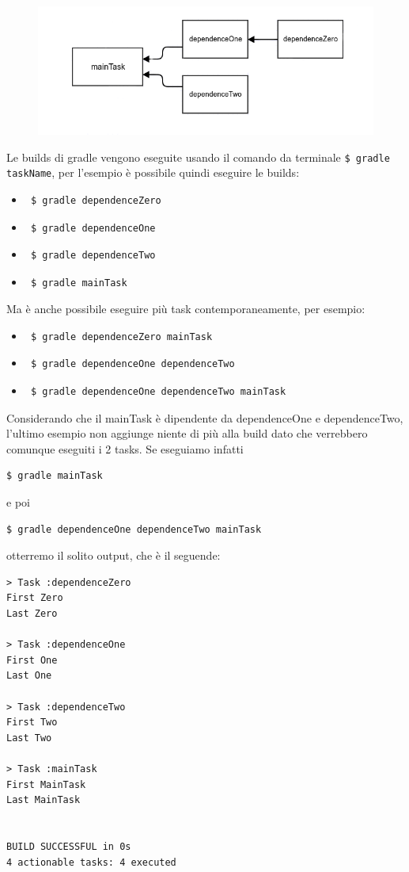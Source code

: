 \begin{figure}[H]
\includegraphics[scale=0.40]{HowToUse/1Task/task_taskDep/graphDep.png}
\end{figure}

Le builds di gradle vengono eseguite usando il comando da terminale \texttt{\$ gradle taskName}, per l'esempio è possibile quindi eseguire le builds:
\begin{itemize}
    \item \begin{verbatim} $ gradle dependenceZero \end{verbatim}
    \item \begin{verbatim} $ gradle dependenceOne \end{verbatim}
    \item \begin{verbatim} $ gradle dependenceTwo \end{verbatim}
    \item \begin{verbatim} $ gradle mainTask \end{verbatim}
\end{itemize}
Ma è anche possibile eseguire più task contemporaneamente, per esempio:
\begin{itemize}
    \item \begin{verbatim} $ gradle dependenceZero mainTask\end{verbatim}
    \item \begin{verbatim} $ gradle dependenceOne dependenceTwo \end{verbatim}
    \item \begin{verbatim} $ gradle dependenceOne dependenceTwo mainTask\end{verbatim}
\end{itemize}
Considerando che il mainTask è dipendente da dependenceOne e dependenceTwo, l'ultimo esempio non aggiunge niente di più alla build dato che verrebbero comunque eseguiti i 2 tasks. Se eseguiamo infatti \begin{verbatim}$ gradle mainTask \end{verbatim} e poi \begin{verbatim}$ gradle dependenceOne dependenceTwo mainTask\end{verbatim} otterremo il solito output, che è il seguende:
\label{outMainTask}
\begin{verbatim}
> Task :dependenceZero 
First Zero
Last Zero

> Task :dependenceOne 
First One
Last One

> Task :dependenceTwo 
First Two
Last Two

> Task :mainTask 
First MainTask
Last MainTask


BUILD SUCCESSFUL in 0s
4 actionable tasks: 4 executed\end{verbatim} 
